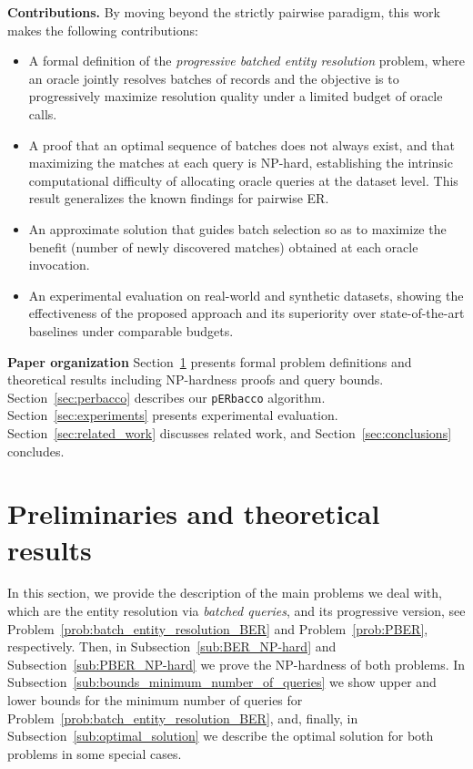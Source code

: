 \documentclass[sigconf, nonacm]{acmart}
\newcommand{\perbacco}{\texttt{pERbacco}\xspace}
\begin{document}
\smallskip
\noindent\textbf{Contributions.}
By moving beyond the strictly pairwise paradigm, this work makes the following contributions:
\begin{itemize}[leftmargin=*, itemsep=0pt, topsep=0pt]
    \item A formal definition of the \emph{progressive batched entity resolution} problem, where an oracle jointly resolves batches of records and the objective is to progressively maximize resolution quality under a limited budget of oracle calls.
    \item A proof that an optimal sequence of batches does not always exist, and that maximizing the matches at each query is NP-hard, establishing the intrinsic computational difficulty of allocating oracle queries at the dataset level. This result generalizes the known findings for pairwise ER.
    \item An approximate solution that guides batch selection so as to maximize the benefit (number of newly discovered matches) obtained at each oracle invocation.
    \item An experimental evaluation on real-world and synthetic datasets, showing the effectiveness of the proposed approach and its superiority over state-of-the-art baselines under comparable budgets.
\end{itemize}



\smallskip
\noindent\textbf{Paper organization}
Section~\ref{sec:theoretical_results} presents formal problem definitions and theoretical results including NP-hardness proofs and query bounds. 
Section~\ref{sec:perbacco} describes our \perbacco algorithm. 
Section~\ref{sec:experiments} presents experimental evaluation.
Section~\ref{sec:related_work} discusses related work, and Section~\ref{sec:conclusions} concludes.


\section{Preliminaries and theoretical results}\label{sec:theoretical_results}

In this section, we provide the description of the main problems we deal with, which are the entity resolution via \emph{batched queries}, and its progressive version, see Problem~\ref{prob:batch_entity_resolution_BER} and Problem~\ref{prob:PBER}, respectively. Then, in Subsection~\ref{sub:BER_NP-hard} and Subsection~\ref{sub:PBER_NP-hard} we prove the NP-hardness of both problems. In Subsection~\ref{sub:bounds_minimum_number_of_queries} we show upper and lower bounds for the minimum number of queries for Problem~\ref{prob:batch_entity_resolution_BER}, and, finally, in Subsection~\ref{sub:optimal_solution} we describe the optimal solution for both problems in some special cases.
\end{document}
